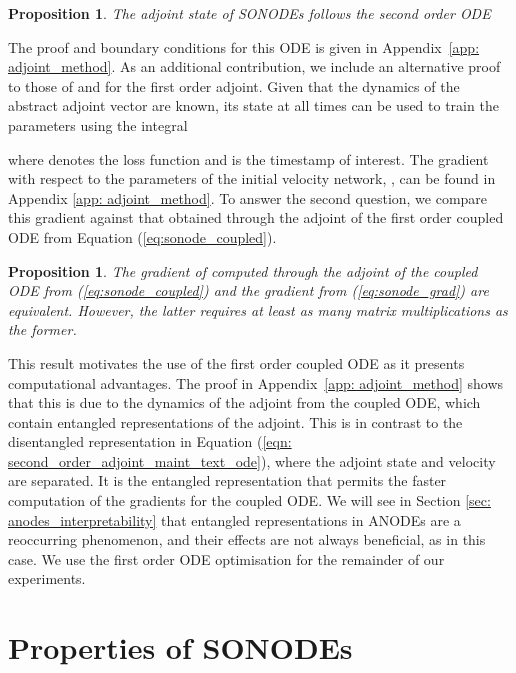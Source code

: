 \documentclass{article}
\newtheorem{proposition}[theorem]{Proposition}
\theoremstyle{remark}
\theoremstyle{definition}
\begin{document}
\begin{proposition}
\label{prop: second_order_adjoint}
The adjoint state  of SONODEs follows the second order ODE

\end{proposition}

The proof and boundary conditions for this ODE is given in Appendix~\ref{app: adjoint_method}. As an additional contribution, we include an alternative proof to those of \citet{chen2018neural} and \citet{pontryagin2018mathematical} for the first order adjoint. Given that the dynamics of the abstract adjoint vector are known, its state at all times  can be used to train the parameters  using the integral

where  denotes the loss function and  is the timestamp of interest. The gradient with respect to the parameters of the initial velocity network, , can be found in Appendix \ref{app: adjoint_method}. To answer the second question, we compare this gradient against that obtained through the adjoint of the first order coupled ODE from Equation (\ref{eq:sonode_coupled}). 

\begin{proposition}
\label{prop: adjoints_are_equivalent}
The gradient of  computed through the adjoint of the coupled ODE from (\ref{eq:sonode_coupled}) and the gradient from (\ref{eq:sonode_grad}) are equivalent. However, the latter requires at least as many matrix multiplications as the former. 
\end{proposition}

This result motivates the use of the first order coupled ODE as it presents computational advantages. The proof in Appendix~\ref{app: adjoint_method} shows that this is due to the dynamics of the adjoint from the coupled ODE, which contain entangled representations of the adjoint. This is in contrast to the disentangled representation in Equation (\ref{eqn: second_order_adjoint_maint_text_ode}), where the adjoint state and velocity are separated. It is the entangled representation that permits the faster computation of the gradients for the coupled ODE. We will see in Section \ref{sec: anodes_interpretability} that entangled representations in ANODEs are a reoccurring phenomenon, and their effects are not always beneficial, as in this case. We use the first order ODE optimisation for the remainder of our experiments.

\section{Properties of SONODEs}
\label{sec: node_problems}
\end{document}
